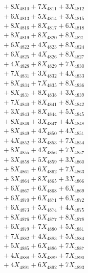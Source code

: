 \documentclass[a4paper,10pt]{article}
\begin{document}
{\begin{align}
&\;  + 8 X_{4810} + 7 X_{4811} + 3 X_{4812} \\[0.3ex]
&\;  + 6 X_{4813} + 5 X_{4814} + 3 X_{4815} \\[0.3ex]
&\;  + 8 X_{4816} + 8 X_{4817} + 6 X_{4818} \\[0.3ex]
&\;  + 8 X_{4819} + 8 X_{4820} + 8 X_{4821} \\[0.3ex]
&\;  + 6 X_{4822} + 4 X_{4823} + 8 X_{4824} \\[0.3ex]
&\;  + 6 X_{4825} + 4 X_{4826} + 8 X_{4827} \\[0.3ex]
&\;  + 4 X_{4828} + 8 X_{4829} + 7 X_{4830} \\[0.3ex]
&\;  + 7 X_{4831} + 3 X_{4832} + 4 X_{4833} \\[0.3ex]
&\;  + 8 X_{4834} + 7 X_{4835} + 8 X_{4836} \\[0.3ex]
&\;  + 8 X_{4837} + 8 X_{4838} + 3 X_{4839} \\[0.5ex]\allowbreak
&\;  + 7 X_{4840} + 8 X_{4841} + 8 X_{4842} \\[0.3ex]
&\;  + 3 X_{4843} + 8 X_{4844} + 5 X_{4845} \\[0.3ex]
&\;  + 8 X_{4846} + 3 X_{4847} + 4 X_{4848} \\[0.3ex]
&\;  + 8 X_{4849} + 4 X_{4850} + 4 X_{4851} \\[0.3ex]
&\;  + 4 X_{4852} + 3 X_{4853} + 7 X_{4854} \\[0.3ex]
&\;  + 8 X_{4855} + 4 X_{4856} + 7 X_{4857} \\[0.3ex]
&\;  + 3 X_{4858} + 5 X_{4859} + 3 X_{4860} \\[0.3ex]
&\;  + 8 X_{4861} + 6 X_{4862} + 7 X_{4863} \\[0.3ex]
&\;  + 3 X_{4864} + 8 X_{4865} + 3 X_{4866} \\[0.3ex]
&\;  + 6 X_{4867} + 6 X_{4868} + 6 X_{4869} \\[0.5ex]\allowbreak
&\;  + 6 X_{4870} + 6 X_{4871} + 6 X_{4872} \\[0.3ex]
&\;  + 6 X_{4873} + 5 X_{4874} + 4 X_{4875} \\[0.3ex]
&\;  + 8 X_{4876} + 6 X_{4877} + 8 X_{4878} \\[0.3ex]
&\;  + 6 X_{4879} + 7 X_{4880} + 5 X_{4881} \\[0.3ex]
&\;  + 7 X_{4882} + 4 X_{4883} + 5 X_{4884} \\[0.3ex]
&\;  + 5 X_{4885} + 6 X_{4886} + 7 X_{4887} \\[0.3ex]
&\;  + 4 X_{4888} + 5 X_{4889} + 7 X_{4890} \\[0.3ex]
&\;  + 4 X_{4891} + 6 X_{4892} + 7 X_{4893} \\[0.3ex]

\end{align}}
\end{document}
